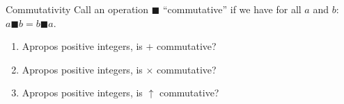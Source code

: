 \documentclass[12pt,letterpaper]{article}
\begin{document}
\begin{problem}{Commutativity}
 Call an operation $\blacksquare$ ``commutative'' if we have for all $a$ and
 $b$: $a \blacksquare b = b \blacksquare a$.

 \begin{enumerate}[\hspace{.5cm}a.]
  \item Apropos positive integers, is $+$ commutative?
  \item Apropos positive integers, is $\times$ commutative?
  \item Apropos positive integers, is $\uparrow$ commutative?
 \end{enumerate}
\end{problem}
\end{document}
